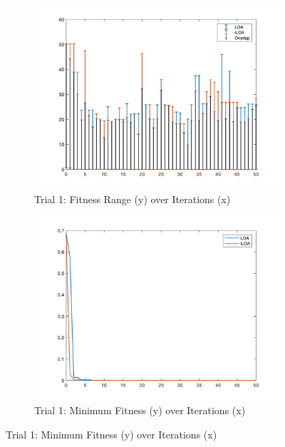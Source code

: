 \begin{figure}
  \centering
  \begin{subfigure}[b]{0.4\textwidth}
    \includegraphics[width=\textwidth]{img/bars/f3/1}
    \caption{ \scriptsize Trial 1: Fitness Range (y) over Iterations (x)}
    \label{fig:f3-b-1}
  \end{subfigure}
  \begin{subfigure}[b]{0.4\textwidth}
    \includegraphics[width=\textwidth]{img/fits/f3/1}
    \caption{ \scriptsize Trial 1: Minimum Fitness (y) over Iterations (x)}
    \label{fig:f3-f-1}
  \end{subfigure}


\end{figure}

